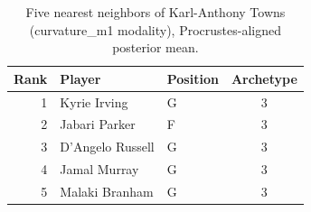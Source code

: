 \begin{table}[htbp]
  \centering\small
  \begin{tabular}{rllc}
    \toprule
    Rank & Player & Position & Archetype \\
    \midrule
    1 & Kyrie Irving & G & 3 \\
    2 & Jabari Parker & F & 3 \\
    3 & D'Angelo Russell & G & 3 \\
    4 & Jamal Murray & G & 3 \\
    5 & Malaki Branham & G & 3 \\
    \bottomrule
  \end{tabular}
  \caption{Five nearest neighbors of Karl-Anthony Towns (curvature_m1 modality), Procrustes-aligned posterior mean.}
  \label{tab:Karl_Anthony_Towns_neighbors_curvature_m1}
\end{table}


